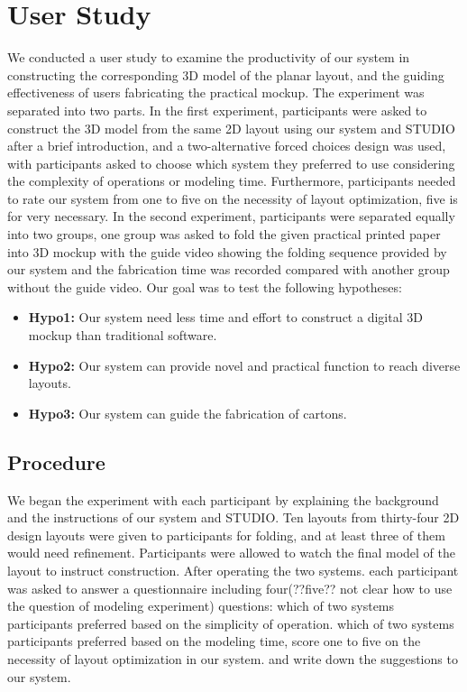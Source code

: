 \section{User Study}
We conducted a user study to examine the productivity of our system in constructing the corresponding 3D model of the planar layout, and the guiding effectiveness of users fabricating the practical mockup. The experiment was separated into two parts. In the first experiment, participants were asked to construct the 3D model from the same 2D layout using our system and STUDIO after a brief introduction, and a two-alternative forced choices design was used, with participants asked to choose which system they preferred to use considering the complexity of operations or modeling time. Furthermore, participants needed to rate our system from one to five on the necessity of layout optimization, five is for very necessary. In the second experiment, participants were separated equally into two groups, one group was asked to fold the given practical printed paper into 3D mockup with the guide video showing the folding sequence provided by our system and the fabrication time was recorded compared with another group without the guide video. Our goal was to test the following hypotheses:

\begin{itemize}
	\item \textbf{Hypo1:} Our system need less time and effort to construct a digital 3D mockup than traditional software.
	\item \textbf{Hypo2:} Our system can provide novel and practical function to reach diverse layouts.
	\item \textbf{Hypo3:} Our system can guide the fabrication of cartons.
\end{itemize}

\subsection{Procedure}
We began the experiment with each participant by explaining the background and the instructions of our system and STUDIO. Ten layouts from thirty-four 2D design layouts were given to participants for folding, and at least three of them would need refinement. Participants were allowed to watch the final model of the layout to instruct construction. After operating the two systems. each participant was asked to answer a questionnaire including four(??five?? not clear how to use the question of modeling experiment) questions: which of two systems participants preferred based on the simplicity of operation. which of two systems participants preferred based on the modeling time, score one to five on the necessity of layout optimization in our system. and write down the suggestions to our system.

